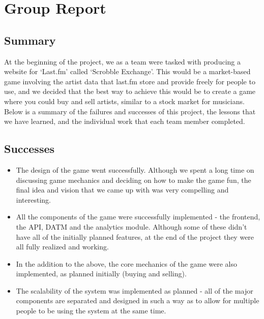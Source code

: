 \documentclass[a4paper,10pt,twoside]{article}
\begin{document}
\section{Group Report}
\subsection{Summary}
At the beginning of the project, we as a team were tasked with producing a website for `Last.fm' called `Scrobble Exchange'. This would be a market-based game involving the artist data that last.fm store and provide freely for people to use, and we decided that the best way to achieve this would be to create a game where you could buy and sell artists, similar to a stock market for musicians. Below is a summary of the failures and successes of this project, the lessons that we have learned, and the individual work that each team member completed.

\subsection{Successes}
\begin{itemize}
\item The design of the game went successfully. Although we spent a long time on discussing game mechanics and deciding on how to make the game fun, the final idea and vision that we came up with was very compelling and interesting.
\item All the components of the game were successfully implemented - the frontend, the API, DATM and the analytics module. Although some of these didn't have all of the initially planned features, at the end of the project they were all fully realized and working.
\item In the addition to the above, the core mechanics of the game were also implemented, as planned initially (buying and selling).
\item The scalability of the system was implemented as planned - all of the major components are separated and designed in such a way as to allow for multiple people to be using the system at the same time.
\end{itemize}
\end{document}
